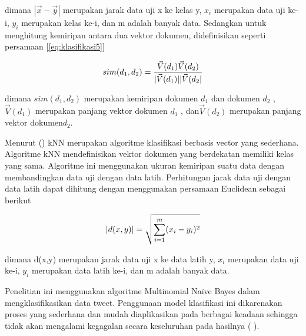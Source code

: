 dimana $ |\vec{x}-\vec{y}| $  merupakan jarak data uji x ke kelas y, $ x_{i} $ merupakan data uji ke-i, $ y_{i} $ merupakan kelas ke-i, dan m adalah banyak data. Sedangkan untuk menghitung kemiripan antara dua vektor dokumen, didefinisikan seperti persamaan [\ref{eq:klasifikasi5}] 

\begin{equation}
	\begin{split}
	\tiny
	sim(d_{1},d_{2}) = \frac{\vec{V}(d_{1})\vec{V}(d_{2})}{|\vec{V}(d_{1})||\vec{V}(d_{2}|} 
	\label{eq:klasifikasi5}
	\normalsize
	\end{split}
\end{equation}

dimana $ sim(d_{1},d_{2}) $ merupakan kemiripan dokumen $ d_{1} $ dan dokumen $ d_{2} $ , $ \vec{V}(d_{1}) $ merupakan panjang vektor dokumen $ d_{1} $ , dan$  \vec{V}(d_{2}) $ merupakan panjang vektor dokumen$ d_{2} $. 

Menurut \citeauthor{ALKHATIB2013} (\cite*{ALKHATIB2013}) kNN merupakan algoritme klasifikasi berbasis vector yang sederhana. Algoritme kNN mendefinisikan vektor dokumen yang berdekatan memiliki kelas yang sama. Algoritme ini menggunakan ukuran kemiripan suatu data dengan membandingkan data uji dengan data latih. Perhitungan jarak data uji dengan data latih dapat dihitung dengan menggunakan persamaan Euclidean sebagai berikut

\begin{equation}
	\begin{split}
		\tiny
		|d(x,y)| = \sqrt{\sum^{m}_{i=1}(x_{i}-y_{i})^2} 
		\label{eq:klasifikasi6}
		\normalsize
	\end{split}
\end{equation}

dimana d(x,y)  merupakan jarak data uji x ke data latih y, $ x_{i} $ merupakan data uji ke-i, $ y_{i} $ merupakan data latih ke-i, dan m adalah banyak data. 

Penelitian ini menggunakan algoritme Multinomial Naïve Bayes dalam mengklasifikasikan data tweet. Penggunaan model klasifikasi ini dikarenakan proses yang sederhana dan mudah diaplikasikan pada berbagai keadaan sehingga tidak akan mengalami kegagalan secara keseluruhan pada hasilnya (\citeauthor{MANNING2008} \cite*{MANNING2008}).  


